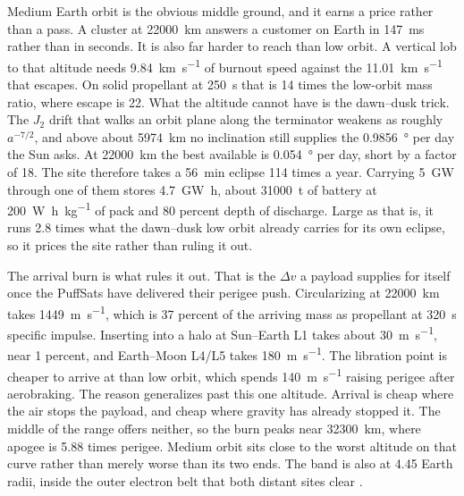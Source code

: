 \documentclass{article}
\newcommand{\deltav}{\Delta v}
\begin{document}
Medium Earth orbit is the obvious middle ground, and it earns a price rather than a pass. A cluster at \SI{22000}{\kilo\meter} answers a customer on Earth in \SI{147}{\milli\second} rather than in seconds. It is also far harder to reach than low orbit. A vertical lob to that altitude needs \SI{9.84}{\kilo\meter\per\second} of burnout speed against the \SI{11.01}{\kilo\meter\per\second} that escapes. On solid propellant at \SI{250}{\second} that is 14 times the low-orbit mass ratio, where escape is 22. What the altitude cannot have is the dawn--dusk trick. The $J_2$ drift that walks an orbit plane along the terminator weakens as roughly $a^{-7/2}$, and above about \SI{5974}{\kilo\meter} no inclination still supplies the \SI{0.9856}{\degree} per day the Sun asks. At \SI{22000}{\kilo\meter} the best available is \SI{0.054}{\degree} per day, short by a factor of 18. The site therefore takes a \SI{56}{\minute} eclipse 114 times a year. Carrying \SI{5}{\giga\watt} through one of them stores \SI[inter-unit-product={}]{4.7}{\giga\watt\hour}, about \SI{31000}{\tonne} of battery at \SI[inter-unit-product={}]{200}{\watt\hour\per\kilo\gram} of pack and 80 percent depth of discharge. Large as that is, it runs 2.8 times what the dawn--dusk low orbit already carries for its own eclipse, so it prices the site rather than ruling it out.

The arrival burn is what rules it out. That is the $\deltav$ a payload supplies for itself once the PuffSats have delivered their perigee push. Circularizing at \SI{22000}{\kilo\meter} takes \SI{1449}{\meter\per\second}, which is 37 percent of the arriving mass as propellant at \SI{320}{\second} specific impulse. Inserting into a halo at Sun--Earth L1 takes about \SI{30}{\meter\per\second}, near 1 percent, and Earth--Moon L4/L5 takes \SI{180}{\meter\per\second}. The libration point is cheaper to arrive at than low orbit, which spends \SI{140}{\meter\per\second} raising perigee after aerobraking. The reason generalizes past this one altitude. Arrival is cheap where the air stops the payload, and cheap where gravity has already stopped it. The middle of the range offers neither, so the burn peaks near \SI{32300}{\kilo\meter}, where apogee is 5.88 times perigee. Medium orbit sits close to the worst altitude on that curve rather than merely worse than its two ends. The band is also at 4.45 Earth radii, inside the outer electron belt that both distant sites clear \cite{li2019vanallen}.
\end{document}
